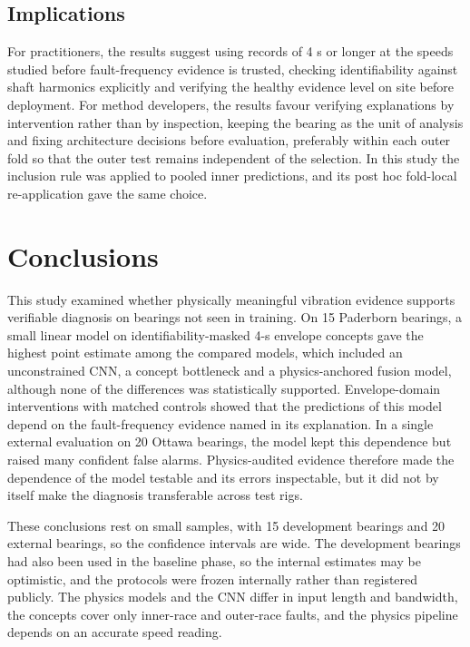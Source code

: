 \documentclass[10pt,letterpaper]{article}
\begin{document}
\subsection*{Implications}
For practitioners, the results suggest using records of 4 s or longer at the speeds studied before fault-frequency evidence is trusted, checking identifiability against shaft harmonics explicitly and verifying the healthy evidence level on site before deployment. For method developers, the results favour verifying explanations by intervention rather than by inspection, keeping the bearing as the unit of analysis and fixing architecture decisions before evaluation, preferably within each outer fold so that the outer test remains independent of the selection. In this study the inclusion rule was applied to pooled inner predictions, and its post hoc fold-local re-application gave the same choice.

\section*{Conclusions}
This study examined whether physically meaningful vibration evidence supports verifiable diagnosis on bearings not seen in training. On 15 Paderborn bearings, a small linear model on identifiability-masked 4-s envelope concepts gave the highest point estimate among the compared models, which included an unconstrained CNN, a concept bottleneck and a physics-anchored fusion model, although none of the differences was statistically supported. Envelope-domain interventions with matched controls showed that the predictions of this model depend on the fault-frequency evidence named in its explanation. In a single external evaluation on 20 Ottawa bearings, the model kept this dependence but raised many confident false alarms. Physics-audited evidence therefore made the dependence of the model testable and its errors inspectable, but it did not by itself make the diagnosis transferable across test rigs.

These conclusions rest on small samples, with 15 development bearings and 20 external bearings, so the confidence intervals are wide. The development bearings had also been used in the baseline phase, so the internal estimates may be optimistic, and the protocols were frozen internally rather than registered publicly. The physics models and the CNN differ in input length and bandwidth, the concepts cover only inner-race and outer-race faults, and the physics pipeline depends on an accurate speed reading.
\end{document}
